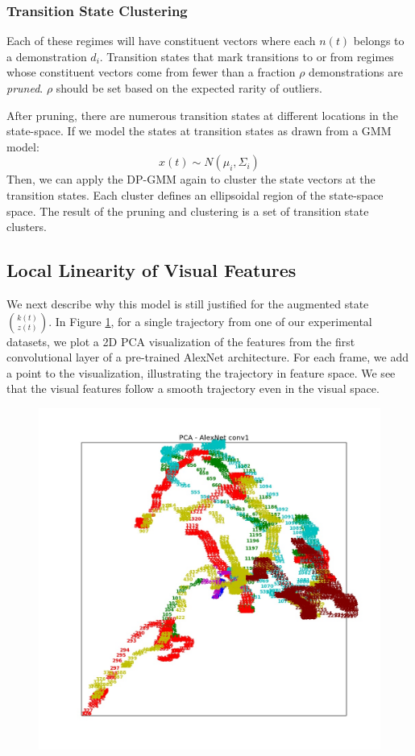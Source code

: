 \subsubsection{Transition State Clustering}\label{prun}
Each of these regimes will have constituent vectors where each $n(t)$ belongs to a demonstration $d_i$. 
Transition states that mark transitions to or from regimes whose constituent vectors come from fewer than a fraction $\rho$ demonstrations are \emph{pruned}.
$\rho$ should be set based on the expected rarity of outliers.

After pruning, there are numerous transition states at different locations in the state-space.
If we model the states at transition states as drawn from a GMM model:
\[
{x}(t) \sim N(\mu_i, \Sigma_i)
\]
Then, we can apply the DP-GMM again to cluster the state vectors at the transition states.
Each cluster defines an ellipsoidal region of the state-space space.
The result of the pruning and clustering is a set of transition state clusters.

\subsection{Local Linearity of Visual Features}
We next describe why this model is still justified for the augmented state $\binom{k(t)}{z(t)}$.
In Figure \ref{fig:imgtraj}, for a single trajectory from one of our experimental datasets, we plot a 2D PCA visualization of the features from the first convolutional layer of a pre-trained AlexNet architecture. For each frame, we add a point to the visualization, illustrating the trajectory in feature space.
We see that the visual features follow a smooth trajectory even in the visual space. 

\begin{figure}[ht]
\centering
\includegraphics[width=\columnwidth]{figures/E5cap2_AlexNet_conv1_pca.jpg}
\caption{ \label{fig:imgtraj}}
\end{figure}
